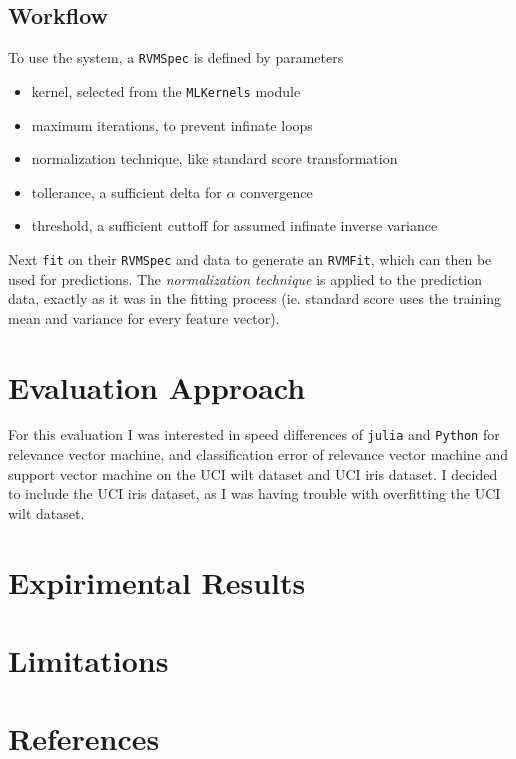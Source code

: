 \documentclass[11pt]{article} %
\def\rv{relevance vector\xspace}
\def\rvm{\rv machine\xspace}
\def\svm{support vector machine\xspace}
\def\julia{\texttt{julia}\xspace}
\def\python{\texttt{Python}\xspace}
\def\wilt{UCI wilt dataset\xspace}
\def\iris{UCI iris dataset\xspace}
\begin{document}
\subsection{Workflow}
To use the system, a \texttt{RVMSpec} is defined by parameters
\begin{itemize}
  \setlength\itemsep{0em}
\item kernel, selected from the \texttt{MLKernels} module
\item maximum iterations, to prevent infinate loops
\item normalization technique, like standard score transformation
\item tollerance, a sufficient delta for $\alpha$ convergence
\item threshold, a sufficient cuttoff for assumed infinate inverse variance
\end{itemize}

Next \texttt{fit} on their \texttt{RVMSpec} and data to
generate an \texttt{RVMFit}, which can then be used for predictions.
The {\em normalization technique} is applied to the prediction
data, exactly as it was in the fitting process (ie. standard
score uses the training mean and variance for every feature vector).

\section{Evaluation Approach}
For this evaluation I was interested in speed differences of \julia and \python for \rvm, and classification error of \rvm and \svm on the \wilt and \iris. I decided to include the \iris, as I was having trouble with overfitting the \wilt.

\section{Expirimental Results}
\section{Limitations}
\section{References}
\end{document}
